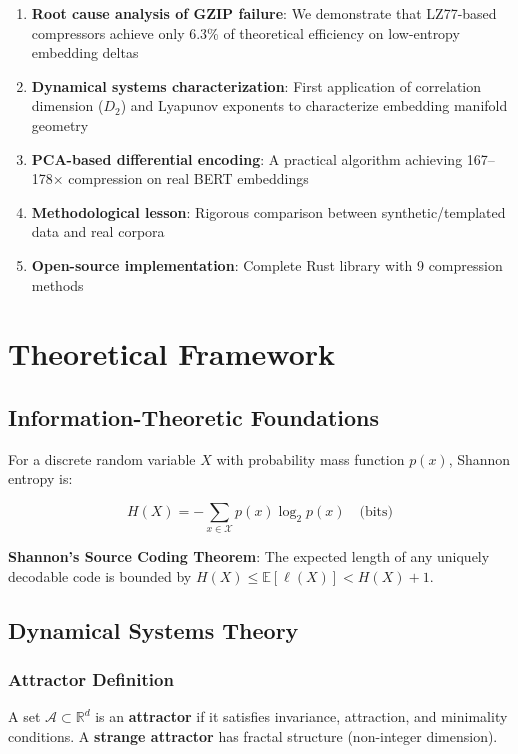 \documentclass[utf8]{FrontiersinVancouver}
\begin{document}
\begin{enumerate}
\item \textbf{Root cause analysis of GZIP failure}: We demonstrate that LZ77-based compressors achieve only 6.3\% of theoretical efficiency on low-entropy embedding deltas
\item \textbf{Dynamical systems characterization}: First application of correlation dimension ($D_2$) and Lyapunov exponents to characterize embedding manifold geometry
\item \textbf{PCA-based differential encoding}: A practical algorithm achieving 167--178$\times$ compression on real BERT embeddings
\item \textbf{Methodological lesson}: Rigorous comparison between synthetic/templated data and real corpora
\item \textbf{Open-source implementation}: Complete Rust library with 9 compression methods
\end{enumerate}

\section{Theoretical Framework}

\subsection{Information-Theoretic Foundations}

For a discrete random variable $X$ with probability mass function $p(x)$, Shannon entropy is:

\begin{equation}
H(X) = -\sum_{x \in \mathcal{X}} p(x) \log_2 p(x) \quad \text{(bits)}
\end{equation}

\textbf{Shannon's Source Coding Theorem}: The expected length of any uniquely decodable code is bounded by $H(X) \leq \mathbb{E}[\ell(X)] < H(X) + 1$.

\subsection{Dynamical Systems Theory}

\subsubsection{Attractor Definition}

A set $\mathcal{A} \subset \mathbb{R}^d$ is an \textbf{attractor} if it satisfies invariance, attraction, and minimality conditions. A \textbf{strange attractor} has fractal structure (non-integer dimension).
\end{document}
